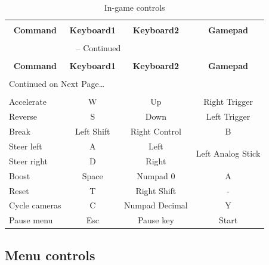\documentclass[11pt]{article}
\begin{document}
\begin{center}
\begin{longtable}{lccc}
\caption{In-game controls} \label{ingame-controls-table} \\

\hline \hline \\[-2ex]
   \multicolumn{1}{c}{\textbf{Command}} &
   \multicolumn{1}{c}{\textbf{Keyboard1}} &
   \multicolumn{1}{c}{\textbf{Keyboard2}} &
   \multicolumn{1}{c}{\textbf{Gamepad}} \\[0.5ex] \hline
   \\[-1.8ex]
\endfirsthead

\multicolumn{3}{c}{{\tablename} \thetable{} -- Continued} \\[0.5ex]
  \hline \hline \\[-2ex]
  \multicolumn{1}{c}{\textbf{Command}} &
  \multicolumn{1}{c}{\textbf{Keyboard1}} &
  \multicolumn{1}{c}{\textbf{Keyboard2}} &
  \multicolumn{1}{c}{\textbf{Gamepad}} \\[0.5ex] \hline
  \\[-1.8ex]
\endhead

  \multicolumn{3}{l}{{Continued on Next Page\ldots}} \\
\endfoot

  \\[-1.8ex] \hline \hline
\endlastfoot

Accelerate & W & Up & Right Trigger \\ 
Reverse & S & Down & Left Trigger \\
Break & Left Shift & Right Control & B \\ 
Steer left & A & Left & \multirow{2}{*}{Left Analog Stick} \\ 
Steer right & D & Right \\
Boost & Space & Numpad 0 & A \\
Reset & T & Right Shift & - \\
Cycle cameras & C & Numpad Decimal & Y \\
Pause menu & Esc & Pause key & Start \\
\end{longtable}
\end{center}

\subsection{Menu controls}
\end{document}
